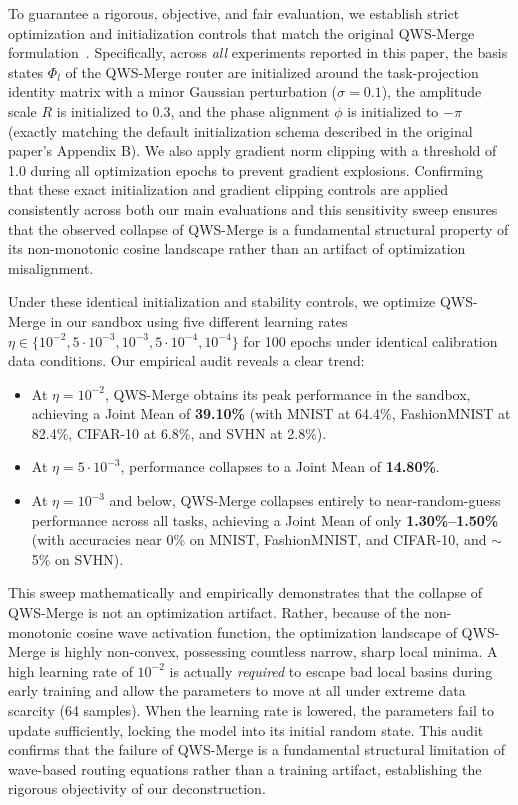 To guarantee a rigorous, objective, and fair evaluation, we establish strict optimization and initialization controls that match the original QWS-Merge formulation~\cite{qwsmerge}. Specifically, across \textit{all} experiments reported in this paper, the basis states $\Phi_l$ of the QWS-Merge router are initialized around the task-projection identity matrix with a minor Gaussian perturbation ($\sigma = 0.1$), the amplitude scale $R$ is initialized to 0.3, and the phase alignment $\phi$ is initialized to $-\pi$ (exactly matching the default initialization schema described in the original paper's Appendix B). We also apply gradient norm clipping with a threshold of 1.0 during all optimization epochs to prevent gradient explosions. Confirming that these exact initialization and gradient clipping controls are applied consistently across both our main evaluations and this sensitivity sweep ensures that the observed collapse of QWS-Merge is a fundamental structural property of its non-monotonic cosine landscape rather than an artifact of optimization misalignment.

Under these identical initialization and stability controls, we optimize QWS-Merge in our sandbox using five different learning rates $\eta \in \{10^{-2}, 5 \cdot 10^{-3}, 10^{-3}, 5 \cdot 10^{-4}, 10^{-4}\}$ for 100 epochs under identical calibration data conditions. Our empirical audit reveals a clear trend:
\begin{itemize}
    \item At $\eta = 10^{-2}$, QWS-Merge obtains its peak performance in the sandbox, achieving a Joint Mean of \textbf{39.10\%} (with MNIST at 64.4\%, FashionMNIST at 82.4\%, CIFAR-10 at 6.8\%, and SVHN at 2.8\%).
    \item At $\eta = 5 \cdot 10^{-3}$, performance collapses to a Joint Mean of \textbf{14.80\%}.
    \item At $\eta = 10^{-3}$ and below, QWS-Merge collapses entirely to near-random-guess performance across all tasks, achieving a Joint Mean of only \textbf{1.30\%--1.50\%} (with accuracies near 0\% on MNIST, FashionMNIST, and CIFAR-10, and $\sim$5\% on SVHN).
\end{itemize}

This sweep mathematically and empirically demonstrates that the collapse of QWS-Merge is not an optimization artifact. Rather, because of the non-monotonic cosine wave activation function, the optimization landscape of QWS-Merge is highly non-convex, possessing countless narrow, sharp local minima. A high learning rate of $10^{-2}$ is actually \textit{required} to escape bad local basins during early training and allow the parameters to move at all under extreme data scarcity (64 samples). When the learning rate is lowered, the parameters fail to update sufficiently, locking the model into its initial random state. This audit confirms that the failure of QWS-Merge is a fundamental structural limitation of wave-based routing equations rather than a training artifact, establishing the rigorous objectivity of our deconstruction.

